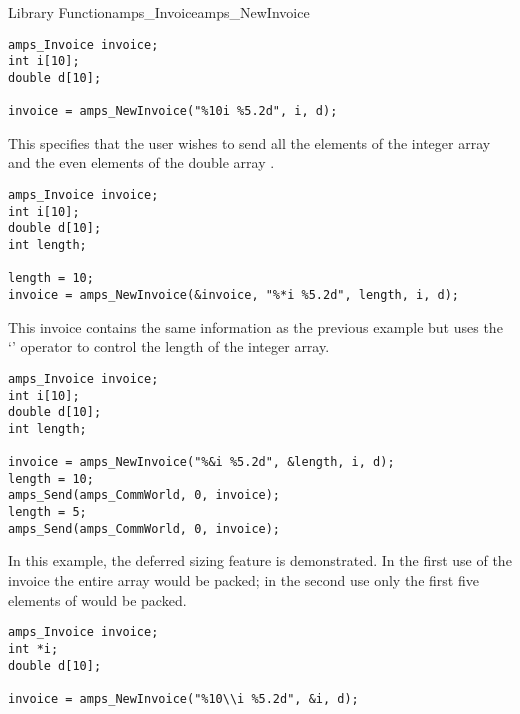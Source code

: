 \begin{deftypefn}{Library Function}{amps_Invoice}{amps\_NewInvoice}
{\EXAMPLE
\begin{display}\begin{verbatim}
amps_Invoice invoice;
int i[10];
double d[10]; 

invoice = amps_NewInvoice("%10i %5.2d", i, d);
\end{verbatim}\end{display}

This specifies that the user wishes to send all the elements of the
integer array  and the even elements of the double array .

\EXAMPLE
\begin{display}\begin{verbatim}
amps_Invoice invoice;
int i[10];
double d[10]; 
int length;

length = 10;
invoice = amps_NewInvoice(&invoice, "%*i %5.2d", length, i, d);
\end{verbatim}\end{display}

This invoice contains the same information as the previous example but uses
the `\code{*}' operator to control the length of the integer array.

\EXAMPLE
\begin{display}\begin{verbatim}
amps_Invoice invoice;
int i[10];
double d[10]; 
int length;

invoice = amps_NewInvoice("%&i %5.2d", &length, i, d);
length = 10;
amps_Send(amps_CommWorld, 0, invoice);
length = 5;
amps_Send(amps_CommWorld, 0, invoice);
\end{verbatim}\end{display}
In this example, the deferred sizing feature is demonstrated.  In the
first use of the invoice the entire array  would be packed; in
the second use only the first five elements of  would be
packed.
\EXAMPLE
\begin{display}\begin{verbatim}
amps_Invoice invoice;
int *i;
double d[10]; 

invoice = amps_NewInvoice("%10\\i %5.2d", &i, d);

\end{verbatim}\end{display}



}
\end{deftypefn}
